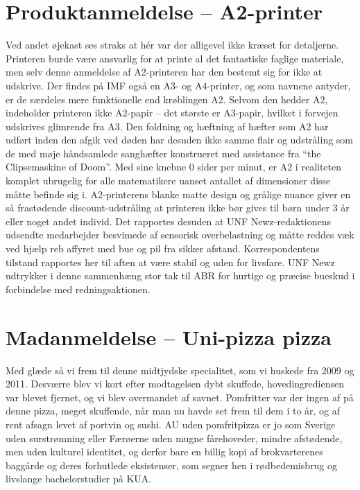 \begin{minipage}[b]{0.95\linewidth}
\begin{minipage}[t]{0.47\textwidth}
\section*{Produktanmeldelse -- A2-printer}
Ved andet øjekast ses straks at hér var der alligevel ikke kræset for detaljerne. Printeren burde være ansvarlig for at printe al det fantastiske faglige materiale, men selv denne anmeldelse af A2-printeren har den bestemt sig for ikke at udskrive. Der findes på IMF også en A3- og A4-printer, og som navnene antyder, er de særdeles mere funktionelle end krøblingen A2. Selvom den hedder A2, indeholder printeren ikke A2-papir -- det største er A3-papir, hvilket i forvejen udskrives glimrende fra A3. Den foldning og hæftning af hæfter som A2 har udført inden den afgik ved døden har desuden ikke samme flair og udstråling som de med møje håndsamlede sanghæfter konstrueret med assistance fra ``the Clipsemaskine of Doom''.
Med sine knebne 0 sider per minut, er A2 i realiteten komplet ubrugelig for alle matematikere uanset antallet af dimensioner disse måtte befinde sig i. A2-printerens blanke matte design og grålige nuance giver en så frastødende discount-udstråling at printeren ikke bør gives til børn under 3 år eller noget andet individ. Det rapportes desuden at UNF Newz-redaktionens udsendte medarbejder besvimede af sensorisk overbelastning og måtte reddes væk ved hjælp reb affyret med bue og pil fra sikker afstand. Korrespondentens tilstand rapportes her til aften at være stabil og uden for livsfare. UNF Newz udtrykker i denne sammenhæng stor tak til ABR for hurtige og præcise bueskud i forbindelse med redningsaktionen.

\vspace{1mm}
\section*{Madanmeldelse -- Uni-pizza pizza}

\vspace{2mm}

Med glæde så vi frem til denne midtjydske specialitet, som vi huskede fra 2009 og 2011. Desværre blev vi kort efter modtagelsen dybt skuffede, hovedingrediensen var blevet fjernet, og vi blev overmandet af savnet. Pomfritter var der ingen af på denne pizza, meget skuffende, når man nu havde set frem til dem i to år, og af rent afsagn levet af portvin og sushi. AU uden pomfritpizza er jo som Sverige uden surstrømning eller Færøerne uden mugne fårehoveder, mindre afstødende, men uden kulturel identitet, og derfor bare en billig kopi af brokvarterenes baggårde  og deres forhutlede eksistenser, som segner hen i rødbedemisbrug og livslange bachelorstudier på KUA. 

\end{minipage}
\end{minipage}
